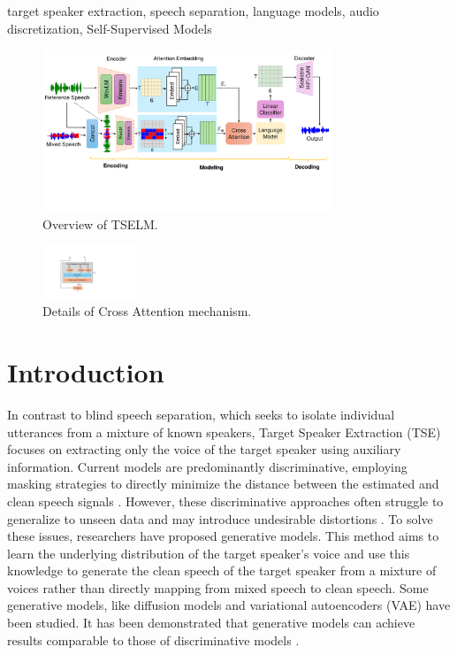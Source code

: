 \documentclass[conference]{IEEEtran}
\begin{document}
\begin{IEEEkeywords}
target speaker extraction, speech separation, language models, audio discretization, Self-Supervised Models
\end{IEEEkeywords}
\begin{figure}[t]
    \centering
    \includegraphics[width=0.77\textwidth]{assets/model.pdf}
    \caption{Overview of TSELM.}
    \label{model}
    \vspace{-12pt}
    \end{figure}

    \begin{figure}
        \centering
        \includegraphics[width=0.25\textwidth]{assets/cross_attention.pdf}
        \caption{Details of Cross Attention mechanism.}
        \label{cross_attention}
        \vspace{-17pt}
        \end{figure}


        
\section{Introduction}

In contrast to blind speech separation, which seeks to isolate individual utterances from a mixture of known speakers, Target Speaker Extraction (TSE) focuses on extracting only the voice of the target speaker using auxiliary information. Current models are predominantly discriminative, employing masking strategies to directly minimize the distance between the estimated and clean speech signals \cite{luo2019conv,spex_plus,sepformer,sef_net}. However, these discriminative approaches often struggle to generalize to unseen data and may introduce undesirable distortions \cite{distortion}. To solve these issues, researchers have proposed generative models. This method aims to learn the underlying distribution of the target speaker's voice and use this knowledge to generate the clean speech of the target speaker from a mixture of voices rather 
than directly mapping from mixed speech to clean speech. Some generative models, like diffusion
models \cite{target_diff} and variational autoencoders (VAE) \cite{vae} have been studied. It has been demonstrated that generative models can achieve results comparable to those of discriminative models \cite{target_diff,tokensplit}.
\end{document}
